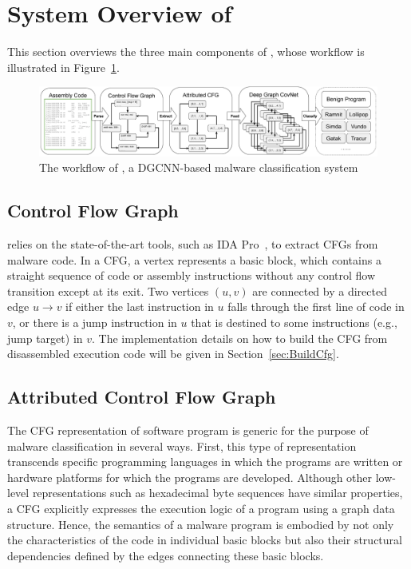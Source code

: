 \section{System Overview of \sysname}
\label{MG:Sec:System}

This section overviews the three main components of \sysname, whose workflow is illustrated in Figure~\ref{fig:SystemPipeline}.

\begin{figure}[htbp]
\centerline{\includegraphics[width=1.0\textwidth]{Magic/figures/SystemPipeline.eps}}
\caption{The workflow of \sysname, a DGCNN-based malware classification system}
\label{fig:SystemPipeline}
\end{figure}

\subsection{Control Flow Graph}\label{subsec:ConstructCfg}

\sysname relies on the state-of-the-art tools, such as IDA Pro~\cite{bib:idapro}, to extract CFGs from malware code.
In a CFG, a vertex represents a basic block, which contains a straight sequence of code or assembly instructions without any control flow transition except at its exit.
Two vertices $(u, v)$ are connected by a directed edge $u \rightarrow v$ if either the last instruction in $u$ falls through the first line of code in $v$,
or there is a jump instruction in $u$ that is destined to some instructions (e.g., jump target) in $v$.
The implementation details on how to build the CFG from disassembled execution code will be given in Section~\ref{sec:BuildCfg}.

\subsection{Attributed Control Flow Graph}\label{subsec:Cfg2Acfg}
The CFG representation of software program is generic for the purpose of malware classification in several ways.
First, this type of representation transcends specific programming languages in which the programs are written or hardware platforms for which the programs are developed.
Although other low-level representations such as hexadecimal byte sequences have similar properties, a CFG explicitly expresses the execution logic of a program using a graph data structure.
Hence, the semantics of a malware program is embodied by not only the characteristics of the code in individual basic blocks but also their structural dependencies defined by the edges connecting these basic blocks. 



